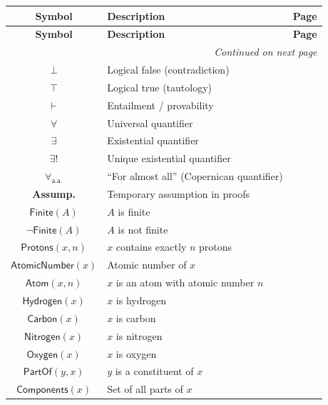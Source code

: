 \documentclass{amsart}
\newcommand{\Finite}[1]{\mathsf{Finite}(#1)}
\newcommand{\NotFinite}[1]{\neg\mathsf{Finite}(#1)}
\newcommand{\ExistsUniq}{\exists!}
\newenvironment{glossarytable}{%
	\renewcommand{\arraystretch}{1.3}%
	\setlength{\tabcolsep}{4pt}%
	\begin{longtable}{|c|l|c|}
		\hline
		\textbf{Symbol} & \textbf{Description} & \textbf{Page} \\
		\hline
		\endfirsthead
		\hline
		\textbf{Symbol} & \textbf{Description} & \textbf{Page} \\
		\hline
		\endhead
		\hline
		\multicolumn{3}{r}{\textit{Continued on next page}} \\
		\endfoot
		\hline
		\endlastfoot
	}{%
	\end{longtable}%
}
\theoremstyle{break}
\newcommand{\Forall}{\forall}
\newcommand{\Exists}{\exists}
\begin{document}
\begin{glossarytable}
	$\bot$ & Logical false (contradiction) & \pageref{eq:bot} \\
	$\top$ & Logical true (tautology) & \pageref{eq:top} \\
	$\vdash$ & Entailment / provability & \pageref{eq:entailment} \\
	$\Forall$ & Universal quantifier & \pageref{eq:leibniz} \\
	$\Exists$ & Existential quantifier & \pageref{eq:leibniz} \\
	$\ExistsUniq$ & Unique existential quantifier & \pageref{eq:leibniz} \\
	$\Forall_{\mathsf{a.a.}}$ & “For almost all” (Copernican quantifier) & \pageref{ax:COP} \\
	\textbf{Assump.} & Temporary assumption in proofs & \pageref{sec:proof-tables} \\
	
	$\Finite{A}$ & $A$ is finite  & \pageref{def:finite} \\
	$\NotFinite{A}$ & $A$ is not finite  & \pageref{def:not-finite} \\
	
	$\mathsf{Protons}(x,n)$ & $x$ contains exactly $n$ protons & \pageref{def:protons} \\
	$\mathsf{AtomicNumber}(x)$ & Atomic number of $x$ & \pageref{def:atomicnumber} \\
	$\mathsf{Atom}(x,n)$ & $x$ is an atom with atomic number $n$ & \pageref{def:atom} \\
	$\mathsf{Hydrogen}(x)$ & $x$ is hydrogen & \pageref{def:hydrogen} \\
	$\mathsf{Carbon}(x)$ & $x$ is carbon & \pageref{def:carbon} \\
	$\mathsf{Nitrogen}(x)$ & $x$ is nitrogen & \pageref{def:nitrogen} \\
	$\mathsf{Oxygen}(x)$ & $x$ is oxygen & \pageref{def:oxygen} \\
	$\mathsf{PartOf}(y,x)$ & $y$ is a constituent of $x$ & \pageref{def:partof} \\
	$\mathsf{Components}(x)$ & Set of all parts of $x$ & \pageref{def:components} \\
	

\end{glossarytable}
\end{document}
